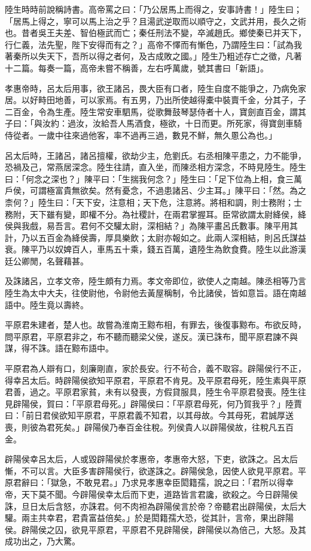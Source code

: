 \begin{pinyinscope}
陸生時時前說稱詩書。高帝罵之曰：「乃公居馬上而得之，安事詩書！」陸生曰；「居馬上得之，寧可以馬上治之乎？且湯武逆取而以順守之，文武并用，長久之術也。昔者吳王夫差、智伯極武而亡；秦任刑法不變，卒滅趙氏。鄉使秦已并天下，行仁義，法先聖，陛下安得而有之？」高帝不懌而有慚色，乃謂陸生曰：「試為我著秦所以失天下，吾所以得之者何，及古成敗之國。」陸生乃粗述存亡之徵，凡著十二篇。每奏一篇，高帝未嘗不稱善，左右呼萬歲，號其書曰「新語」。

孝惠帝時，呂太后用事，欲王諸呂，畏大臣有口者，陸生自度不能爭之，乃病免家居。以好畤田地善，可以家焉。有五男，乃出所使越得橐中裝賣千金，分其子，子二百金，令為生產。陸生常安車駟馬，從歌舞鼓琴瑟侍者十人，寶劍直百金，謂其子曰：「與汝約：過汝，汝給吾人馬酒食，極欲，十日而更。所死家，得寶劍車騎侍從者。一歲中往來過他客，率不過再三過，數見不鮮，無久慁公為也。」

呂太后時，王諸呂，諸呂擅權，欲劫少主，危劉氏。右丞相陳平患之，力不能爭，恐禍及己，常燕居深念。陸生往請，直入坐，而陳丞相方深念，不時見陸生。陸生曰：「何念之深也？」陳平曰：「生揣我何念？」陸生曰：「足下位為上相，食三萬戶侯，可謂極富貴無欲矣。然有憂念，不過患諸呂、少主耳。」陳平曰：「然。為之柰何？」陸生曰：「天下安，注意相；天下危，注意將。將相和調，則士務附；士務附，天下雖有變，即權不分。為社稷計，在兩君掌握耳。臣常欲謂太尉絳侯，絳侯與我戲，易吾言。君何不交驩太尉，深相結？」為陳平畫呂氏數事。陳平用其計，乃以五百金為絳侯壽，厚具樂飲；太尉亦報如之。此兩人深相結，則呂氏謀益衰。陳平乃以奴婢百人，車馬五十乘，錢五百萬，遺陸生為飲食費。陸生以此游漢廷公卿閒，名聲藉甚。

及誅諸呂，立孝文帝，陸生頗有力焉。孝文帝即位，欲使人之南越。陳丞相等乃言陸生為太中大夫，往使尉他，令尉他去黃屋稱制，令比諸侯，皆如意旨。語在南越語中。陸生竟以壽終。

平原君朱建者，楚人也。故嘗為淮南王黥布相，有罪去，後復事黥布。布欲反時，問平原君，平原君非之，布不聽而聽梁父侯，遂反。漢已誅布，聞平原君諫不與謀，得不誅。語在黥布語中。

平原君為人辯有口，刻廉剛直，家於長安。行不茍合，義不取容。辟陽侯行不正，得幸呂太后。時辟陽侯欲知平原君，平原君不肯見。及平原君母死，陸生素與平原君善，過之。平原君家貧，未有以發喪，方假貸服具，陸生令平原君發喪。陸生往見辟陽侯，賀曰：「平原君母死。」辟陽侯曰：「平原君母死，何乃賀我乎？」陸賈曰：「前日君侯欲知平原君，平原君義不知君，以其母故。今其母死，君誠厚送喪，則彼為君死矣。」辟陽侯乃奉百金往稅。列侯貴人以辟陽侯故，往稅凡五百金。

辟陽侯幸呂太后，人或毀辟陽侯於孝惠帝，孝惠帝大怒，下吏，欲誅之。呂太后慚，不可以言。大臣多害辟陽侯行，欲遂誅之。辟陽侯急，因使人欲見平原君。平原君辭曰：「獄急，不敢見君。」乃求見孝惠幸臣閎籍孺，說之曰：「君所以得幸帝，天下莫不聞。今辟陽侯幸太后而下吏，道路皆言君讒，欲殺之。今日辟陽侯誅，旦日太后含怒，亦誅君。何不肉袒為辟陽侯言於帝？帝聽君出辟陽侯，太后大驩。兩主共幸君，君貴富益倍矣。」於是閎籍孺大恐，從其計，言帝，果出辟陽侯。辟陽侯之囚，欲見平原君，平原君不見辟陽侯，辟陽侯以為倍己，大怒。及其成功出之，乃大驚。


\end{pinyinscope}
